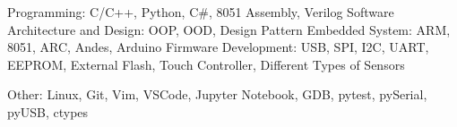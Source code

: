 

\begin{cvskills}

  \cvskill
    {Programming: } %
    {C/C++, Python, C{\#}, 8051 Assembly, Verilog} %
  \cvskill
    {Software Architecture and Design: } %
    {OOP, OOD, Design Pattern} %
  \cvskill
    {Embedded System: } %
    {ARM, 8051, ARC, Andes, Arduino} %
  \cvskill
    {Firmware Development: } %
    {USB, SPI, I2C, UART, EEPROM, External Flash, Touch Controller, Different Types of Sensors} %


  \cvskill
    {Other: } %
    {Linux, Git, Vim, VSCode, Jupyter Notebook, GDB, pytest, pySerial, pyUSB, ctypes} %

\end{cvskills}
